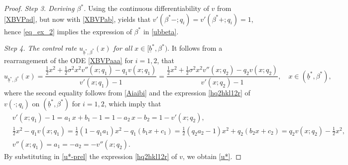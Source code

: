 \documentclass[11pt]{article} %
\def\ub{\underline{b}}
\numberwithin{komcounter}{section}
\begin{document}
\begin{proof}
\vspace{1mm}
{\it Step 3. Deriving $\beta^*$.}  
Using the continuous differentiability of $v$ from \eqref{XBVPad}, but now with \eqref{XBVPab}, yields that $v'(\beta^*-;q_i) = v'(\beta^*+;q_i) = 1$, hence \eqref{eq_ex_2} implies the expression of $\beta^*$ in \eqref{ubbeta}.


\vspace{1mm}
{\it Step 4. The control rate $u_{\ub^*,\beta^*}(x)$ for all $x \in [\ub^*,\beta^*)$}.
It follows from a rearrangement of the ODE \eqref{XBVPaaa} for $i=1,2$, that 
\begin{equation} \label{u*-prel}
u_{\ub^*,\beta^*}(x) 
= \frac{\tfrac12 x^2 + \tfrac12 \sigma^2 x^2 v''(x;q_1) - q_1 v(x;q_1)}{v'(x;q_1) - 1} 
= \frac{\tfrac12 x^2 + \tfrac12 \sigma^2 x^2 v''(x;q_2) - q_2 v(x;q_2)}{v'(x;q_2) - 1} 
, \quad x \in (\ub^*,\beta^*), 
\end{equation}
where the second equality follows from \eqref{Aiaibi} and the expression \eqref{hq2hkl12r} of $v(\cdot;q_i)$ on $(\ub^*,\beta^*)$ for $i=1,2$, which imply that 
\begin{align*}
&v'(x;q_1) - 1 
= a_1 \, x + b_1 - 1 
= 1 - a_2 \, x - b_2
= 1 - v'(x;q_2), \\
&\tfrac12 x^2 - q_1 v(x;q_1) 
= \tfrac12 (1 - q_1 a_1) x^2 - q_1 (b_1 x + c_1) 
= \tfrac12 (q_2 a_2 - 1) x^2 + q_2 (b_2 x + c_2) 
= q_2 v(x;q_2) - \tfrac12 x^2, \\
&v''(x;q_1) = a_1 = - a_2 = - v''(x;q_2).
\end{align*}
By substituting in \eqref{u*-prel} the expression \eqref{hq2hkl12r} of $v$, we obtain \eqref{u*}.


\end{proof}
\end{document}
